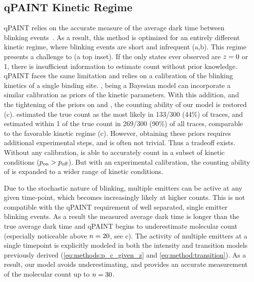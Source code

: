 \subsection{qPAINT Kinetic Regime}
qPAINT relies on the accurate measure of the average dark time between blinking events~\citep{jungmann_2016}. 
	As a result, this method is optimized for an entirely different kinetic regime, where blinking 
	events are short and infrequent (a,b).
	This regime presents a challenge to \ours (a top inset). 
	If the only states ever observed are $z_{}=0$ or 1, there is insufficient 
	information to estimate count without prior knowledge.
	qPAINT faces the same limitation and relies on a calibration 
	of the blinking kinetics of a single binding site.
	\ours, being a Bayesian model can incorporate a similar calibration 
	as priors of the kinetic parameters.
	With this addition, and the tightening of the priors on \re and \rb, the counting 
	ability of our model is restored (c). 
	\ours estimated the true count as the most likely in 133/300 (44\%) of traces, and 
	estimated within 1 of the true count in 269/300 (90\%) of all traces,
	comparable to the favorable kinetic regime (c).
	However, obtaining these priors requires additional experimental steps, and is often not trivial. 
	Thus a tradeoff exists.
	Without any calibration, \ours is able to accurately count in a subset of kinetic conditions ($p_\text{on} > p_\text{off}$).
	But with an experimental calibration, the counting ability of \ours is expanded to a wider range of kinetic conditions. 

Due to the stochastic nature of blinking, multiple emitters can 
be active at any given time-point, which becomes increasingly likely at higher counts.
	This is not compatible with the qPAINT requirement of well separated, 
	single emitter blinking events.
	As a result the measured average dark time is longer than the true average dark time
	and  qPAINT begins to underestimate molecular count 
	(especially noticeable above $n=20$, see c). 
	The activity of multiple emitters at a single timepoint is explicitly modeled in both the 
	intensity and transition models previously derived (\eqref{eq:methods:p_c_given_z} and \eqref{eq:method:transition}). 
	As a result, our model avoids underestimating, and provides an accurate measurement 
	of the molecular count up to $n=30$.
	
